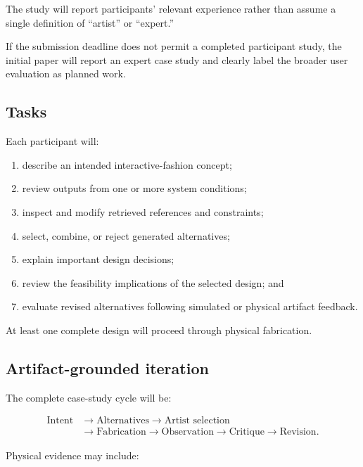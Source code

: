 \documentclass{article}
\begin{document}
The study will report participants' relevant experience rather than assume a
single definition of ``artist'' or ``expert.''

If the submission deadline does not permit a completed participant study, the
initial paper will report an expert case study and clearly label the broader
user evaluation as planned work.

\subsection{Tasks}

Each participant will:

\begin{enumerate}[leftmargin=*]
    \item describe an intended interactive-fashion concept;
    \item review outputs from one or more system conditions;
    \item inspect and modify retrieved references and constraints;
    \item select, combine, or reject generated alternatives;
    \item explain important design decisions;
    \item review the feasibility implications of the selected design; and
    \item evaluate revised alternatives following simulated or physical
    artifact feedback.
\end{enumerate}

At least one complete design will proceed through physical fabrication.

\subsection{Artifact-grounded iteration}

The complete case-study cycle will be:

\begin{equation}
\begin{aligned}
\text{Intent}
&\rightarrow \text{Alternatives}
\rightarrow \text{Artist selection} \\
&\rightarrow \text{Fabrication}
\rightarrow \text{Observation}
\rightarrow \text{Critique}
\rightarrow \text{Revision}.
\end{aligned}
\end{equation}

Physical evidence may include:
\end{document}
